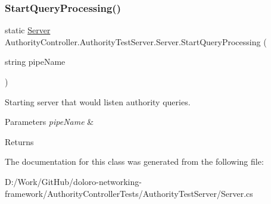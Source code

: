 \subsubsection{\texorpdfstring{Start\+Query\+Processing()}{StartQueryProcessing()}}
{\footnotesize\ttfamily static \mbox{\hyperlink{class_authority_controller_1_1_authority_test_server_1_1_server}{Server}} Authority\+Controller.\+Authority\+Test\+Server.\+Server.\+Start\+Query\+Processing (\begin{DoxyParamCaption}\item[{string}]{pipe\+Name }\end{DoxyParamCaption})\hspace{0.3cm}{\ttfamily [static]}}



Starting server that would listen authority queries. 


\begin{DoxyParams}{Parameters}
{\em pipe\+Name} & \\
\hline
\end{DoxyParams}
\begin{DoxyReturn}{Returns}

\end{DoxyReturn}


The documentation for this class was generated from the following file\+:\begin{DoxyCompactItemize}
\item 
D\+:/\+Work/\+Git\+Hub/doloro-\/networking-\/framework/\+Authority\+Controller\+Tests/\+Authority\+Test\+Server/Server.\+cs\end{DoxyCompactItemize}
